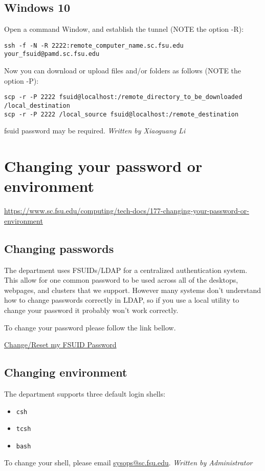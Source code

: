 \documentclass[12pt,a4paper]{article}
\begin{document}
\subsection*{Windows 10}
Open a command Window, and establish the tunnel (NOTE the option -R):
\begin{verbatim}
ssh -f -N -R 2222:remote_computer_name.sc.fsu.edu your_fsuid@pamd.sc.fsu.edu
\end{verbatim}
Now you can download or upload files and/or folders as follows (NOTE the option -P):
\begin{verbatim}
scp -r -P 2222 fsuid@localhost:/remote_directory_to_be_downloaded /local_destination
scp -r -P 2222 /local_source fsuid@localhost:/remote_destination
\end{verbatim}
fsuid password may be required.
\hfill \textit{Written by Xiaoguang Li}

\section{Changing your password or environment}
\url{https://www.sc.fsu.edu/computing/tech-docs/177-changing-your-password-or-environment}

\subsection*{Changing passwords}
The department uses FSUIDs/LDAP for a centralized authentication system. This allow for one common password to be used across all of the desktops, webpages, and clusters that we support. However many systems don't understand how to change passwords correctly in LDAP, so if you use a local utility to change your password it probably won't work correctly.

To change your password please follow the link bellow.
\begin{center}
    \href{https://my.fsu.edu/Account-Help/Change-Reset-my-FSUID-Password}{Change/Reset my FSUID Password}
\end{center}

\subsection*{Changing environment}
The department supports three default login shells:
\begin{itemize}
    \item \texttt{csh}
    \item \texttt{tcsh}
    \item \texttt{bash}
\end{itemize}
To change your shell, please email \href{mailto:sysops@sc.fsu.edu}{sysops@sc.fsu.edu}.
\hfill \textit{Written by Administrator}
\end{document}
